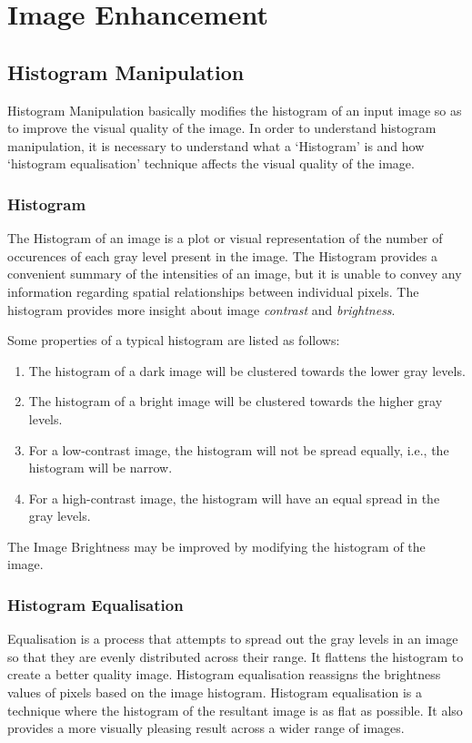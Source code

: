 \chapter{Image Enhancement}

\section{Histogram Manipulation}

Histogram Manipulation basically modifies the histogram of an input image so as to improve the visual quality of the image.
In order to understand histogram manipulation, it is necessary to understand what a `Histogram' is and how `histogram equalisation' technique affects the visual quality of the image.

\subsection{Histogram}
The Histogram of an image is a plot or visual representation of the number of occurences of each gray level present in the image.
The Histogram provides a convenient summary of the intensities of an image, but it is unable to convey any information regarding spatial relationships between individual pixels.
The histogram provides more insight about image \textit{contrast} and \textit{brightness}.

Some properties of a typical histogram are listed as follows:
\begin{enumerate}
    \item The histogram of a dark image will be clustered towards the lower gray levels.
    \item The histogram of a bright image will be clustered towards the higher gray levels.
    \item For a low-contrast image, the histogram will not be spread equally, i.e., the histogram will be narrow.
    \item For a high-contrast image, the histogram will have an equal spread in the gray levels.
\end{enumerate}

The Image Brightness may be improved by modifying the histogram of the image.

\subsection{Histogram Equalisation}

Equalisation is a process that attempts to spread out the gray levels in an image so that they are evenly distributed across their range.
It flattens the histogram to create a better quality image.
Histogram equalisation reassigns the brightness values of pixels based on the image histogram.
Histogram equalisation is a technique where the histogram of the resultant image is as flat as possible.
It also provides a more visually pleasing result across a wider range of images.

